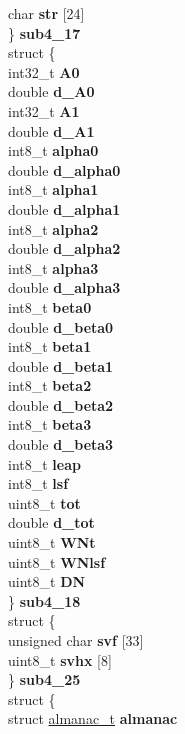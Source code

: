 \begin{DoxyCompactItemize}
{\begin{tabbing}
\>\>char {\bfseries str} \mbox{[}24\mbox{]}\\
\>\} {\bfseries sub4\_17}\\
\>struct \{\\
\>\>int32\_t {\bfseries A0}\\
\>\>double {\bfseries d\_A0}\\
\>\>int32\_t {\bfseries A1}\\
\>\>double {\bfseries d\_A1}\\
\>\>int8\_t {\bfseries alpha0}\\
\>\>double {\bfseries d\_alpha0}\\
\>\>int8\_t {\bfseries alpha1}\\
\>\>double {\bfseries d\_alpha1}\\
\>\>int8\_t {\bfseries alpha2}\\
\>\>double {\bfseries d\_alpha2}\\
\>\>int8\_t {\bfseries alpha3}\\
\>\>double {\bfseries d\_alpha3}\\
\>\>int8\_t {\bfseries beta0}\\
\>\>double {\bfseries d\_beta0}\\
\>\>int8\_t {\bfseries beta1}\\
\>\>double {\bfseries d\_beta1}\\
\>\>int8\_t {\bfseries beta2}\\
\>\>double {\bfseries d\_beta2}\\
\>\>int8\_t {\bfseries beta3}\\
\>\>double {\bfseries d\_beta3}\\
\>\>int8\_t {\bfseries leap}\\
\>\>int8\_t {\bfseries lsf}\\
\>\>uint8\_t {\bfseries tot}\\
\>\>double {\bfseries d\_tot}\\
\>\>uint8\_t {\bfseries WNt}\\
\>\>uint8\_t {\bfseries WNlsf}\\
\>\>uint8\_t {\bfseries DN}\\
\>\} {\bfseries sub4\_18}\\
\>struct \{\\
\>\>unsigned char {\bfseries svf} \mbox{[}33\mbox{]}\\
\>\>uint8\_t {\bfseries svhx} \mbox{[}8\mbox{]}\\
\>\} {\bfseries sub4\_25}\\
\>struct \{\\
\>\>struct \hyperlink{structalmanac__t}{almanac\_t} {\bfseries almanac}\\

\end{tabbing}}
\end{DoxyCompactItemize}
